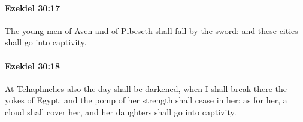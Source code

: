		\paragraph{Ezekiel 30:17} %
			\label{EZEKIEL-30-17}

			The young men of Aven and of Pibeseth shall fall by the sword: and these cities shall go into captivity.


		\paragraph{Ezekiel 30:18} %
			\label{EZEKIEL-30-18}

			At Tehaphnehes also the day shall be darkened, when I shall break there the yokes of Egypt: and the pomp of her strength shall cease in her: as for her, a cloud shall cover her, and her daughters shall go into captivity.


